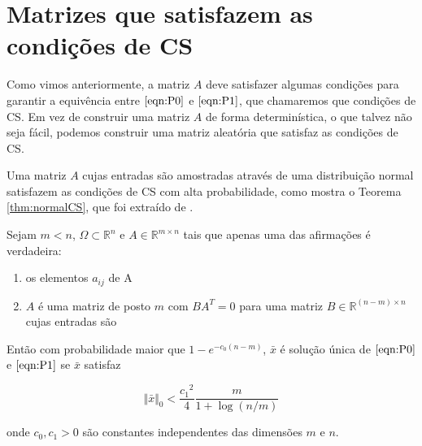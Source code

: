 \section{Matrizes que satisfazem as condições de CS}

Como vimos anteriormente, a matriz $A$ deve satisfazer algumas condições para garantir a equivência entre $\eqref{eqn:P0}$ e $\eqref{eqn:P1}$, que chamaremos que condições de CS. Em vez de construir uma matriz $A$ de forma determinística, o que talvez não seja fácil, podemos construir uma matriz aleatória que satisfaz as condições de CS.



Uma matriz $A$ cujas entradas são amostradas através de uma distribuição normal satisfazem as condições de CS com alta probabilidade, como mostra o Teorema \ref{thm:normalCS}, que foi extraído de \cite{zhang2008theory}.

\begin{teorema} \cite{zhang2008theory} Sejam $m < n$, $\Omega \subset \mathbb{R}^n$ e $A \in \mathbb{R}^{m \times n}$ tais que apenas uma das afirmações é verdadeira:
\begin{enumerate}
\item os elementos $a_{ij}$ de A 
\item $A$ é uma matriz de posto $m$ com $BA^{T} = 0$ para uma matriz $B \in \mathbb{R}^{(n - m) \times n}$ cujas entradas são 
\end{enumerate}
Então com probabilidade maior que $1 - e^{-c_0(n-m)}$, $\bar{x}$ é solução única de $\eqref{eqn:P0}$ e $\eqref{eqn:P1}$ se $\bar{x}$ satisfaz

$$ \Vert \bar{x} \Vert_0 < \frac{{c_1}^2}{4} \frac{m}{1 + \log(n/m)}$$

onde $c_0, c_1 > 0$ são constantes independentes das dimensões $m$ e $n$.
\label{thm:normalCS}
\end{teorema}